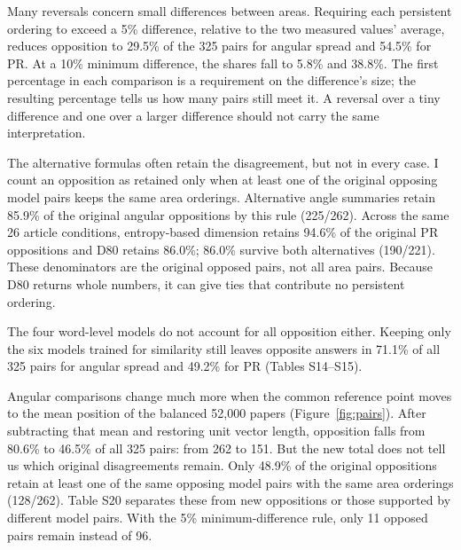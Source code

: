 \documentclass[12pt]{article}
\begin{document}
Many reversals concern small differences between areas. Requiring each persistent ordering to exceed a 5\% difference, relative to the two measured values' average, reduces opposition to 29.5\% of the 325 pairs for angular spread and 54.5\% for PR. At a 10\% minimum difference, the shares fall to 5.8\% and 38.8\%. The first percentage in each comparison is a requirement on the difference's size; the resulting percentage tells us how many pairs still meet it. A reversal over a tiny difference and one over a larger difference should not carry the same interpretation.

The alternative formulas often retain the disagreement, but not in every case. I count an opposition as retained only when at least one of the original opposing model pairs keeps the same area orderings. Alternative angle summaries retain 85.9\% of the original angular oppositions by this rule (225/262). Across the same 26 article conditions, entropy-based dimension retains 94.6\% of the original PR oppositions and D80 retains 86.0\%; 86.0\% survive both alternatives (190/221). These denominators are the original opposed pairs, not all area pairs. Because D80 returns whole numbers, it can give ties that contribute no persistent ordering.

The four word-level models do not account for all opposition either. Keeping only the six models trained for similarity still leaves opposite answers in 71.1\% of all 325 pairs for angular spread and 49.2\% for PR (Tables S14--S15).

Angular comparisons change much more when the common reference point moves to the mean position of the balanced 52,000 papers (Figure~\ref{fig:pairs}). After subtracting that mean and restoring unit vector length, opposition falls from 80.6\% to 46.5\% of all 325 pairs: from 262 to 151. But the new total does not tell us which original disagreements remain. Only 48.9\% of the original oppositions retain at least one of the same opposing model pairs with the same area orderings (128/262). Table S20 separates these from new oppositions or those supported by different model pairs. With the 5\% minimum-difference rule, only 11 opposed pairs remain instead of 96.
\end{document}
